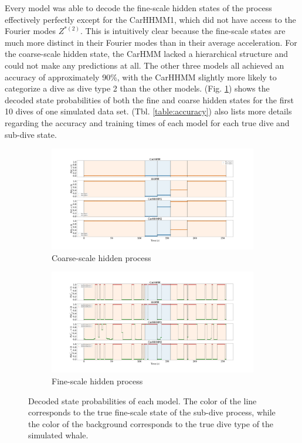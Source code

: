 Every model was able to decode the fine-scale hidden states of the process effectively perfectly except for the CarHHMM1, which did not have access to the Fourier modes $Z^{*(2)}$. This is intuitively clear because the fine-scale states are much more distinct in their Fourier modes than in their average acceleration. For the coarse-scale hidden state, the CarHMM lacked a hierarchical structure and could not make any predictions at all. The other three models all achieved an accuracy of approximately 90\%, with the CarHHMM slightly more likely to categorize a dive as dive type 2 than the other models. (Fig. \ref{fig:acc}) shows the decoded state probabilities of both the fine and coarse hidden states for the first 10 dives of one simulated data set. (Tbl. \ref{table:accuracy}) also lists more details regarding the accuracy and training times of each model for each true dive and sub-dive state.

\begin{figure}[t!]
    \centering
    \begin{subfigure}{1.0\textwidth}
        \centering
        \includegraphics[width=5in]{Plots/Posterior_Coarse_States.png}
        \caption{Coarse-scale hidden process}
    \end{subfigure}
    \newline
    \begin{subfigure}{1.0\textwidth}
        \centering
        \includegraphics[width=5in]{Plots/Posterior_Fine_States.png}
        \caption{Fine-scale hidden process}
    \end{subfigure}
	\caption{Decoded state probabilities of each model. The color of the line corresponds to the true fine-scale state of the sub-dive process, while the color of the background corresponds to the true dive type of the simulated whale.}
	\label{fig:acc}
\end{figure}

